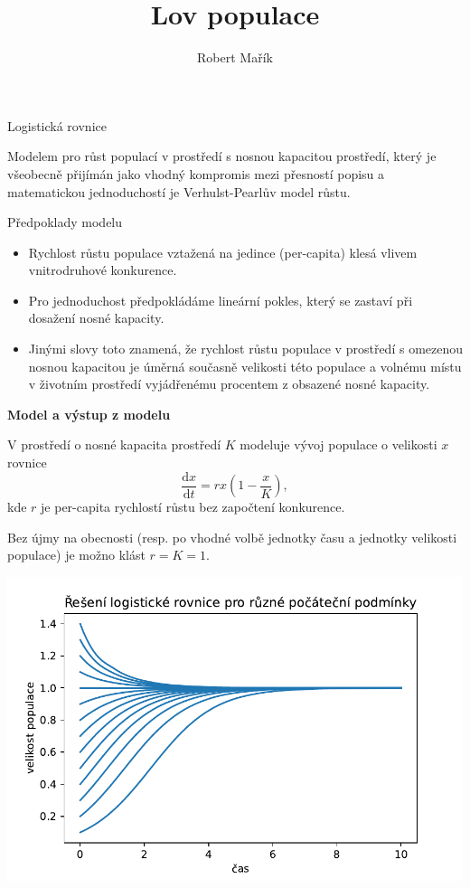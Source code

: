 \documentclass[handouts]{beamer}
\title{Lov populace}
\author{Robert Mařík}
\def\subsection#1{\par {\bfseries #1}\par\smallskip}
\begin{document}
\begin{frame}

  \begin{center}
    \large Logistická rovnice
  \end{center}


Modelem pro růst populací v prostředí s nosnou kapacitou prostředí, který je
všeobecně přijímán jako vhodný kompromis mezi přesností popisu a matematickou
jednoduchostí je Verhulst-Pearlův model růstu.



\begin{block}{Předpoklady modelu}
\begin{itemize}
\item Rychlost růstu populace vztažená na jedince (per-capita) klesá
  vlivem vnitrodruhové konkurence.  
\item Pro jednoduchost předpokládáme
  lineární pokles, který se zastaví při dosažení nosné kapacity.  
\item 
  Jinými slovy toto znamená, že rychlost růstu populace v prostředí s
  omezenou nosnou kapacitou je úměrná současně velikosti této populace
  a volnému místu v životním prostředí vyjádřenému procentem z
  obsazené nosné kapacity.
\end{itemize}
\end{block}

\subsection{Model a výstup z modelu}


\begin{minipage}[t]{0.4\linewidth}
V prostředí o nosné kapacita prostředí $K$ modeluje vývoj populace o
velikosti $x$ rovnice
$$\frac{\mathrm dx}{\mathrm dt}=rx\left(1-\frac xK\right),$$ kde $r$
je per-capita rychlostí růstu bez započtení konkurence.

Bez újmy na obecnosti (resp. po vhodné volbě jednotky času a jednotky
velikosti populace) je možno klást $r=K=1$.
\end{minipage}\begin{minipage}[t]{0.6\linewidth}
  \vspace*{-20pt}
  \includegraphics[width=\linewidth]{logisticka.pdf}
\end{minipage}


\end{frame}
\end{document}
